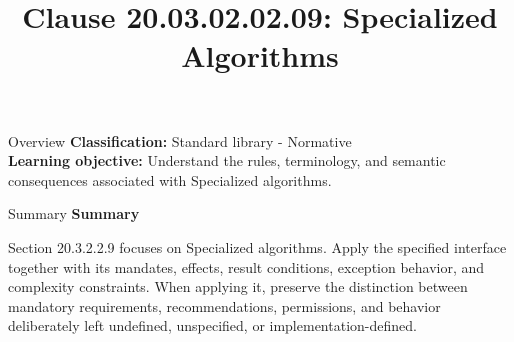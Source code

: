 \documentclass[10pt,letterpaper]{article}
\title{Clause 20.03.02.02.09: Specialized Algorithms}
\author{}
\date{}
\begin{document}
\maketitle
\begin{CornellOverviewBox}{Overview}
\textbf{Classification:} Standard library - Normative\\[2pt]
\textbf{Learning objective:} Understand the rules, terminology, and semantic consequences associated with Specialized algorithms.
\end{CornellOverviewBox}\begin{CornellSummaryBox}{Summary}
{\sffamily\bfseries\color{Accent} Summary}\par\vspace{3pt}Section 20.3.2.2.9 focuses on Specialized algorithms. Apply the specified interface together with its mandates, effects, result conditions, exception behavior, and complexity constraints. When applying it, preserve the distinction between mandatory requirements, recommendations, permissions, and behavior deliberately left undefined, unspecified, or implementation-defined.
\end{CornellSummaryBox}
\end{document}
